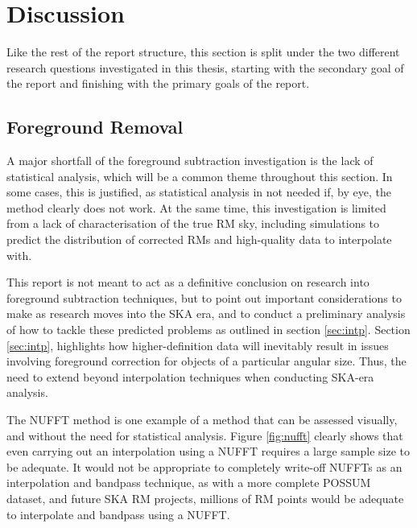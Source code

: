 \chapter{Discussion}
\label{cha:discussion}

Like the rest of the report structure, this section is split under the two different research questions investigated in this thesis, starting with the secondary goal of the report and finishing with the primary goals of the report.

\section{Foreground Removal}
\label{sec:fr_disc}

A major shortfall of the foreground subtraction investigation is the lack of statistical analysis, which will be a common theme throughout this section. In some cases, this is justified, as statistical analysis in not needed if, by eye, the method clearly does not work. At the same time, this investigation is limited from a lack of characterisation of the true RM sky, including simulations to predict the distribution of corrected RMs and high-quality data to interpolate with.


This report is not meant to act as a definitive conclusion on research into foreground subtraction techniques, but to point out important considerations to make as research moves into the SKA era, and to conduct a preliminary analysis of how to tackle these predicted problems as outlined in section \ref{sec:intp}. Section \ref{sec:intp}, highlights how higher-definition data will inevitably result in issues involving foreground correction for objects of a particular angular size. Thus, the need to extend beyond interpolation techniques when conducting SKA-era analysis.


The NUFFT method is one example of a method that can be assessed visually, and without the need for statistical analysis. Figure \ref{fig:nufft} clearly shows that even carrying out an interpolation using a NUFFT requires a large sample size to be adequate. It would not be appropriate to completely write-off NUFFTs as an interpolation and bandpass technique, as with a more complete POSSUM dataset, and future SKA RM projects, millions of RM points would be adequate to interpolate and bandpass using a NUFFT.


